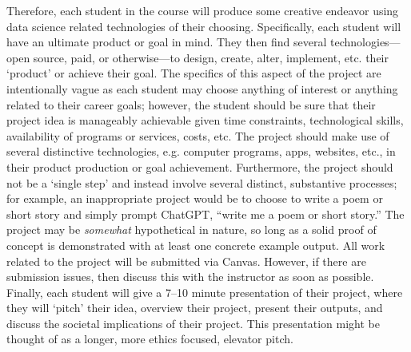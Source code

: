 \documentclass[11pt,letterpaper]{article}
\begin{document}
Therefore, each student in the course will produce some creative endeavor using data science related technologies of their choosing. Specifically, each student will have an ultimate product or goal in mind. They then find several technologies---open source, paid, or otherwise---to design, create, alter, implement, etc. their `product' or achieve their goal. The specifics of this aspect of the project are intentionally vague as each student may choose anything of interest or anything related to their career goals; however, the student should be sure that their project idea is manageably achievable given time constraints, technological skills, availability of programs or services, costs, etc. The project should make use of several distinctive technologies, e.g. computer programs, apps, websites, etc., in their product production or goal achievement. Furthermore, the project should not be a `single step' and instead involve several distinct, substantive processes; for example, an inappropriate project would be to choose to write a poem or short story and simply prompt ChatGPT, ``write me a poem or short story.'' The project may be \textit{somewhat} hypothetical in nature, so long as a solid proof of concept is demonstrated with at least one concrete example output. All work related to the project will be submitted via Canvas. However, if there are submission issues, then discuss this with the instructor as soon as possible. Finally, each student will give a 7--10 minute presentation of their project, where they will `pitch' their idea, overview their project, present their outputs, and discuss the societal implications of their project. This presentation might be thought of as a longer, more ethics focused, elevator pitch. \par\vspace{0.4cm}
\end{document}
